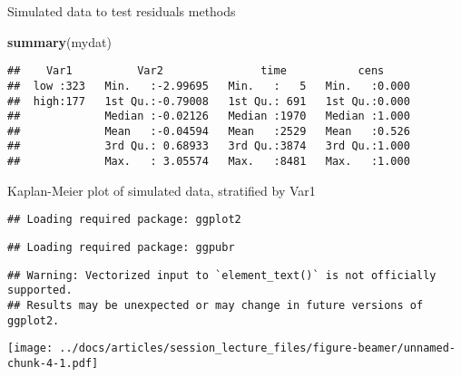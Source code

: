 \documentclass[
  ignorenonframetext,
]{beamer}
\newenvironment{Shaded}{\begin{snugshade}}{\end{snugshade}}
\newcommand{\KeywordTok}[1]{\textcolor[rgb]{0.13,0.29,0.53}{\textbf{#1}}}
\newcommand{\NormalTok}[1]{#1}
\begin{document}
\begin{frame}[fragile]{Simulated data to test residuals methods}
\protect\hypertarget{simulated-data-to-test-residuals-methods}{}

\footnotesize

\begin{Shaded}
\begin{Highlighting}[]
\KeywordTok{summary}\NormalTok{(mydat)}
\end{Highlighting}
\end{Shaded}

\begin{verbatim}
##    Var1          Var2               time           cens      
##  low :323   Min.   :-2.99695   Min.   :   5   Min.   :0.000  
##  high:177   1st Qu.:-0.79008   1st Qu.: 691   1st Qu.:0.000  
##             Median :-0.02126   Median :1970   Median :1.000  
##             Mean   :-0.04594   Mean   :2529   Mean   :0.526  
##             3rd Qu.: 0.68933   3rd Qu.:3874   3rd Qu.:1.000  
##             Max.   : 3.05574   Max.   :8481   Max.   :1.000
\end{verbatim}

\end{frame}

\begin{frame}[fragile]{Kaplan-Meier plot of simulated data, stratified
by Var1}
\protect\hypertarget{kaplan-meier-plot-of-simulated-data-stratified-by-var1}{}

\begin{verbatim}
## Loading required package: ggplot2
\end{verbatim}

\begin{verbatim}
## Loading required package: ggpubr
\end{verbatim}

\begin{verbatim}
## Warning: Vectorized input to `element_text()` is not officially supported.
## Results may be unexpected or may change in future versions of ggplot2.
\end{verbatim}

\texttt{[image: ../docs/articles/session\_lecture\_files/figure-beamer/unnamed-chunk-4-1.pdf]}

\end{frame}
\end{document}
